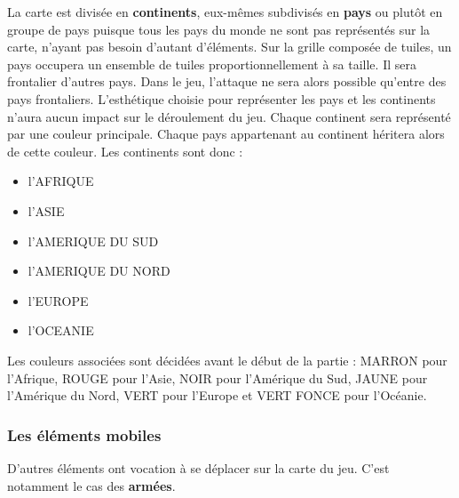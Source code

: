 La carte est divisée en \textbf{continents}, eux-mêmes subdivisés en \textbf{pays} ou plutôt en groupe de pays puisque tous les pays du monde ne sont pas représentés sur la carte, n'ayant pas besoin d'autant d'éléments. Sur la grille composée de tuiles, un pays occupera un ensemble de tuiles proportionnellement à sa taille. Il sera frontalier d'autres pays. Dans le jeu, l'attaque ne sera alors possible qu'entre des pays frontaliers. L'esthétique choisie pour représenter les pays et les continents n'aura aucun impact sur le déroulement du jeu. Chaque continent sera représenté par une couleur principale. Chaque pays appartenant au continent héritera alors de cette couleur. 
\newline
\newline 
Les continents sont donc :
\begin{itemize}
    \item l'AFRIQUE
    \item l'ASIE
    \item l'AMERIQUE DU SUD 
    \item l'AMERIQUE DU NORD 
    \item l'EUROPE 
    \item l'OCEANIE \newline
\end{itemize}

Les couleurs associées sont décidées avant le début de la partie : MARRON pour l'Afrique, ROUGE pour l'Asie, NOIR pour l'Amérique du Sud, JAUNE pour l'Amérique du Nord, VERT pour l'Europe et VERT FONCE pour l'Océanie. 


\subsubsection{Les éléments mobiles}

D'autres éléments ont vocation à se déplacer sur la carte du jeu. C'est notamment le cas des \textbf{armées}. 
\newline 

